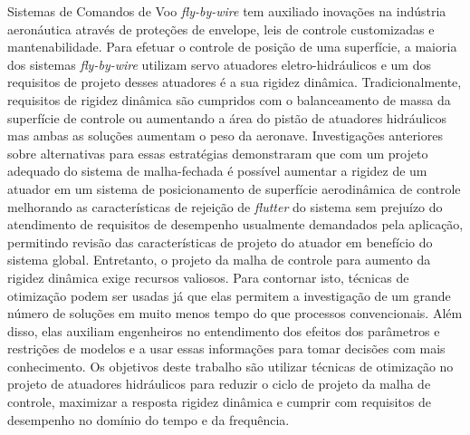 
Sistemas de Comandos de Voo \textit{fly-by-wire} tem auxiliado inovações na indústria aeronáutica através de proteções de envelope, leis de controle customizadas e mantenabilidade. Para efetuar o controle de posição de uma superfície, a maioria dos sistemas \textit{fly-by-wire} utilizam servo atuadores eletro-hidráulicos e um dos requisitos de projeto desses atuadores é a sua rigidez dinâmica. Tradicionalmente, requisitos de rigidez dinâmica são cumpridos com o balanceamento de massa da superfície de controle ou aumentando a área do pistão de atuadores hidráulicos mas ambas as soluções aumentam o peso da aeronave. Investigações anteriores sobre alternativas para essas estratégias demonstraram que com um projeto adequado do sistema de malha-fechada é possível aumentar a rigidez de um atuador em um sistema de posicionamento de superfície aerodinâmica de controle melhorando as características de rejeição de \textit{flutter} do sistema sem prejuízo do atendimento de requisitos de desempenho usualmente demandados pela aplicação, permitindo revisão das características de projeto do atuador em benefício do sistema global. Entretanto, o projeto da malha de controle para aumento da rigidez dinâmica exige recursos valiosos. Para contornar isto, técnicas de otimização podem ser usadas já que elas permitem a investigação de um grande número de soluções em muito menos tempo do que processos convencionais. Além disso, elas auxiliam engenheiros no entendimento dos efeitos dos parâmetros e restrições de modelos e a usar essas informações para tomar decisões com mais conhecimento. Os objetivos deste trabalho são utilizar técnicas de otimização no projeto de atuadores hidráulicos para reduzir o ciclo de projeto da malha de controle, maximizar a resposta rigidez dinâmica e cumprir com requisitos de desempenho no domínio do tempo e da frequência.
